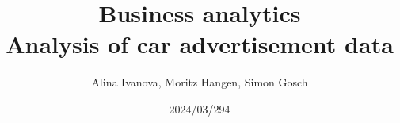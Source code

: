 \title{Business analytics \\ Analysis of car advertisement data}
\author{Alina Ivanova, Moritz Hangen, Simon Gosch}
\date{2024/03/294}
\maketitle